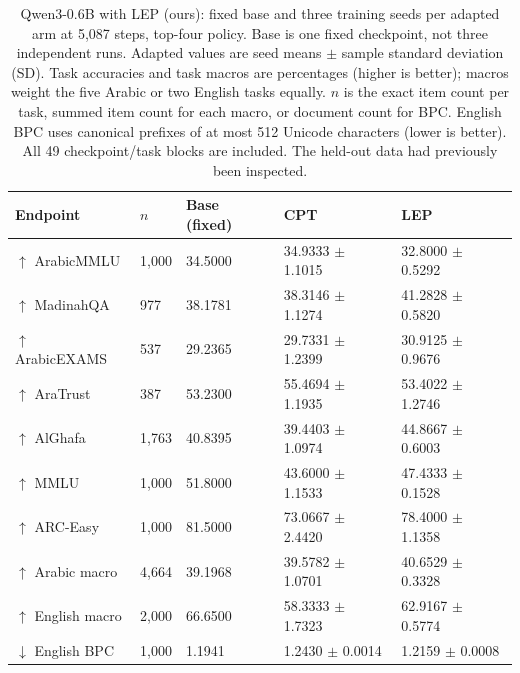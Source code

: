 \begin{table}[t]
\centering
\small
\setlength{\tabcolsep}{4pt}
\begin{tabular}{@{}lllll@{}}
\toprule
Endpoint & $n$ & Base (fixed) & CPT & LEP \\
\midrule
$\uparrow$ ArabicMMLU & 1,000 & 34.5000 & 34.9333 $\pm$ 1.1015 & 32.8000 $\pm$ 0.5292 \\
$\uparrow$ MadinahQA & 977 & 38.1781 & 38.3146 $\pm$ 1.1274 & 41.2828 $\pm$ 0.5820 \\
$\uparrow$ ArabicEXAMS & 537 & 29.2365 & 29.7331 $\pm$ 1.2399 & 30.9125 $\pm$ 0.9676 \\
$\uparrow$ AraTrust & 387 & 53.2300 & 55.4694 $\pm$ 1.1935 & 53.4022 $\pm$ 1.2746 \\
$\uparrow$ AlGhafa & 1,763 & 40.8395 & 39.4403 $\pm$ 1.0974 & 44.8667 $\pm$ 0.6003 \\
$\uparrow$ MMLU & 1,000 & 51.8000 & 43.6000 $\pm$ 1.1533 & 47.4333 $\pm$ 0.1528 \\
$\uparrow$ ARC-Easy & 1,000 & 81.5000 & 73.0667 $\pm$ 2.4420 & 78.4000 $\pm$ 1.1358 \\
$\uparrow$ Arabic macro & 4,664 & 39.1968 & 39.5782 $\pm$ 1.0701 & 40.6529 $\pm$ 0.3328 \\
$\uparrow$ English macro & 2,000 & 66.6500 & 58.3333 $\pm$ 1.7323 & 62.9167 $\pm$ 0.5774 \\
$\downarrow$ English BPC & 1,000 & 1.1941 & 1.2430 $\pm$ 0.0014 & 1.2159 $\pm$ 0.0008 \\
\bottomrule
\end{tabular}
\caption{Qwen3-0.6B with LEP (ours): fixed base and three training seeds per adapted arm at 5,087 steps, top-four policy. Base is one fixed checkpoint, not three independent runs. Adapted values are seed means $\pm$ sample standard deviation (SD). Task accuracies and task macros are percentages (higher is better); macros weight the five Arabic or two English tasks equally. $n$ is the exact item count per task, summed item count for each macro, or document count for BPC. English BPC uses canonical prefixes of at most 512 Unicode characters (lower is better). All 49 checkpoint/task blocks are included. The held-out data had previously been inspected. }
\label{tab:rebuttal-downstream-estimates}
\end{table}
